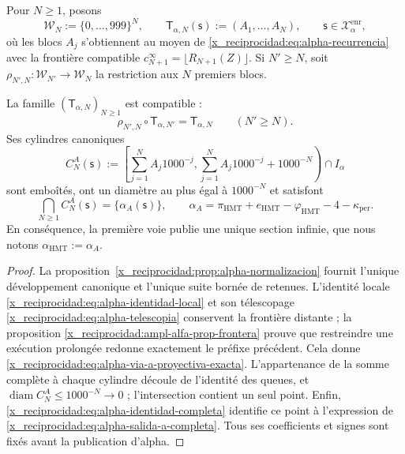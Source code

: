 Pour \(N\geq1\), posons
\[
 \mathcal W_N:=\{0,\ldots,999\}^{N},
 \qquad
 \mathsf T_{\alpha,N}(\mathsf s):=(A_1,\ldots,A_N),
 \qquad \mathsf s\in\mathcal X_{\alpha}^{\mathrm{enr}},
\]
où les blocs \(A_j\) s'obtiennent au moyen de
\eqref{x_reciprocidad:eq:alpha-recurrencia} avec la frontière compatible
\(c_{N+1}^{\infty}=\lfloor R_{N+1}(Z)\rfloor\). Si \(N'\geq N\), soit
\(\rho_{N',N}:\mathcal W_{N'}\to\mathcal W_N\) la restriction aux
\(N\) premiers blocs.

\begin{theorem}
\label{x_reciprocidad:thm:alpha-salida-dodecafasica-completa}
La famille \((\mathsf T_{\alpha,N})_{N\geq1}\) est compatible :
\begin{equation}
 \rho_{N',N}\circ\mathsf T_{\alpha,N'}
 =\mathsf T_{\alpha,N}
 \qquad(N'\geq N).
 \label{x_reciprocidad:eq:alpha-via-a-proyectiva-exacta}
\end{equation}
Ses cylindres canoniques
\begin{equation}
 C_N^A(\mathsf s):=
 \left[
  \sum_{j=1}^{N}A_j1000^{-j},
  \sum_{j=1}^{N}A_j1000^{-j}+1000^{-N}
 \right)\cap I_\alpha
 \label{x_reciprocidad:eq:alpha-cilindros-via-a-exactos}
\end{equation}
sont emboîtés, ont un diamètre au plus égal à \(1000^{-N}\) et satisfont
\begin{equation}
 \bigcap_{N\geq1}C_N^A(\mathsf s)
 =\{\alpha_A(\mathsf s)\},
 \qquad
 \alpha_A
 =\pi_{\mathrm{HMT}}+e_{\mathrm{HMT}}-\varphi_{\mathrm{HMT}}
  -4-\kappa_{\mathrm{per}}.
 \label{x_reciprocidad:eq:alpha-salida-a-completa}
\end{equation}
En conséquence, la première voie publie une unique section infinie, que
nous notons \(\alpha_{\mathrm{HMT}}:=\alpha_A\).
\end{theorem}

\begin{proof}
La proposition~\ref{x_reciprocidad:prop:alpha-normalizacion} fournit l'unique développement canonique et l'unique suite bornée de retenues. L'identité locale \eqref{x_reciprocidad:eq:alpha-identidad-local} et son télescopage \eqref{x_reciprocidad:eq:alpha-telescopia} conservent la frontière distante ; la proposition \ref{x_reciprocidad:ampl-alfa-prop-frontera} prouve que restreindre une exécution prolongée redonne exactement le préfixe précédent. Cela donne \eqref{x_reciprocidad:eq:alpha-via-a-proyectiva-exacta}. L'appartenance de la somme complète à chaque cylindre découle de l'identité des queues, et \(\operatorname{diam}C_N^A\leq1000^{-N}\to0\) ; l'intersection contient un seul point. Enfin, \eqref{x_reciprocidad:eq:alpha-identidad-completa} identifie ce point à l'expression de \eqref{x_reciprocidad:eq:alpha-salida-a-completa}. Tous ses coefficients et signes sont fixés avant la publication d'alpha.
\end{proof}

